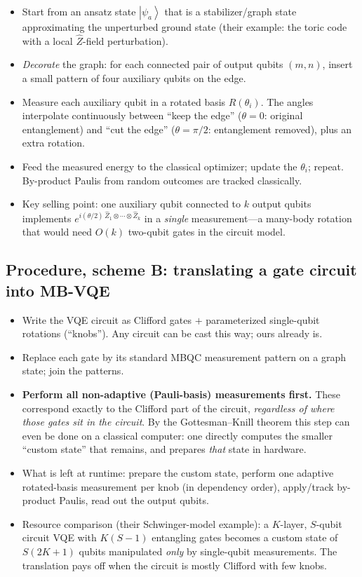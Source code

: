 \documentclass[11pt]{article}
\newcommand{\ket}[1]{\left|#1\right\rangle}
\begin{document}
\begin{itemize}[leftmargin=2em]
  \item Start from an ansatz state $\ket{\psi_a}$ that is a stabilizer/graph
        state approximating the unperturbed ground state (their example: the
        toric code with a local $\hat{Z}$-field perturbation).
  \item \emph{Decorate} the graph: for each connected pair of output qubits
        $(m,n)$, insert a small pattern of four auxiliary qubits on the edge.
  \item Measure each auxiliary qubit in a rotated basis $R(\theta_i)$. The
        angles interpolate continuously between ``keep the edge''
        ($\theta = 0$: original entanglement) and ``cut the edge''
        ($\theta = \pi/2$: entanglement removed), plus an extra rotation.
  \item Feed the measured energy to the classical optimizer; update the
        $\theta_i$; repeat. By-product Paulis from random outcomes are tracked
        classically.
  \item Key selling point: one auxiliary qubit connected to $k$ output qubits
        implements $e^{i(\theta/2)\, \hat Z_1 \otimes \cdots \otimes \hat Z_k}$
        in a \emph{single} measurement---a many-body rotation that would need
        $O(k)$ two-qubit gates in the circuit model.
\end{itemize}

\subsection{Procedure, scheme B: translating a gate circuit into MB-VQE}

\begin{itemize}[leftmargin=2em]
  \item Write the VQE circuit as Clifford gates $+$ parameterized single-qubit
        rotations (``knobs''). Any circuit can be cast this way; ours already is.
  \item Replace each gate by its standard MBQC measurement pattern on a graph
        state; join the patterns.
  \item \textbf{Perform all non-adaptive (Pauli-basis) measurements first.}
        These correspond exactly to the Clifford part of the circuit,
        \emph{regardless of where those gates sit in the circuit}. By the
        Gottesman--Knill theorem this step can even be done on a classical
        computer: one directly computes the smaller ``custom state'' that
        remains, and prepares \emph{that} state in hardware.
  \item What is left at runtime: prepare the custom state, perform one adaptive
        rotated-basis measurement per knob (in dependency order), apply/track
        by-product Paulis, read out the output qubits.
  \item Resource comparison (their Schwinger-model example): a $K$-layer,
        $S$-qubit circuit VQE with $K(S-1)$ entangling gates becomes a custom
        state of $S(2K{+}1)$ qubits manipulated \emph{only} by single-qubit
        measurements. The translation pays off when the circuit is mostly
        Clifford with few knobs.
\end{itemize}
\end{document}
